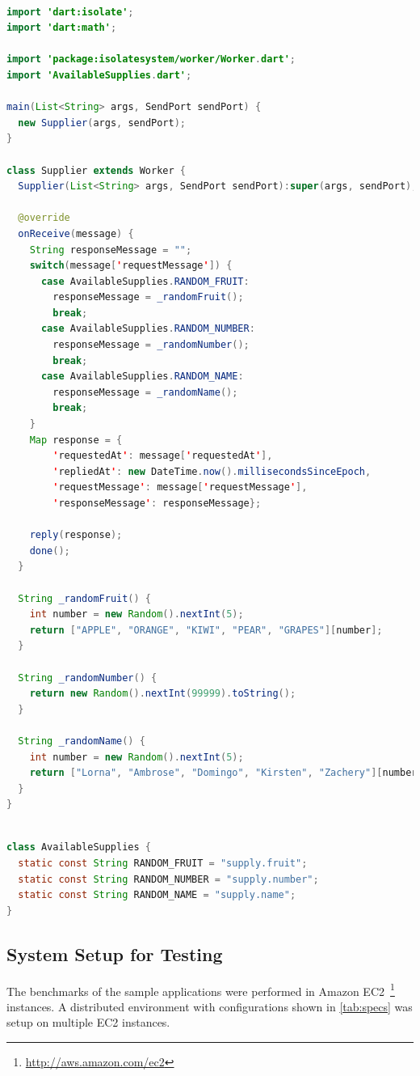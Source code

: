 \begin{lstlisting}[language=java, firstnumber=1, caption=Requester Worker of Requester-Supplier application, label=lst:supplier]

import 'dart:isolate';
import 'dart:math';

import 'package:isolatesystem/worker/Worker.dart';
import 'AvailableSupplies.dart';

main(List<String> args, SendPort sendPort) {
  new Supplier(args, sendPort);
}

class Supplier extends Worker {
  Supplier(List<String> args, SendPort sendPort):super(args, sendPort);

  @override
  onReceive(message) {
    String responseMessage = "";
    switch(message['requestMessage']) {
      case AvailableSupplies.RANDOM_FRUIT:
        responseMessage = _randomFruit();
        break;
      case AvailableSupplies.RANDOM_NUMBER:
        responseMessage = _randomNumber();
        break;
      case AvailableSupplies.RANDOM_NAME:
        responseMessage = _randomName();
        break;
    }
    Map response = {
        'requestedAt': message['requestedAt'],
        'repliedAt': new DateTime.now().millisecondsSinceEpoch,
        'requestMessage': message['requestMessage'],
        'responseMessage': responseMessage};

    reply(response);
    done();
  }

  String _randomFruit() {
    int number = new Random().nextInt(5);
    return ["APPLE", "ORANGE", "KIWI", "PEAR", "GRAPES"][number];
  }

  String _randomNumber() {
    return new Random().nextInt(99999).toString();
  }

  String _randomName() {
    int number = new Random().nextInt(5);
    return ["Lorna", "Ambrose", "Domingo", "Kirsten", "Zachery"][number];
  }
}

\end{lstlisting}

\begin{lstlisting}[language=java, firstnumber=1, caption=Supporting class that contains list of constants for pattern matching, label=lst:supportingClass]

class AvailableSupplies {
  static const String RANDOM_FRUIT = "supply.fruit";
  static const String RANDOM_NUMBER = "supply.number";
  static const String RANDOM_NAME = "supply.name";
}
\end{lstlisting}


\subsection{System Setup for Testing}
    The benchmarks of the sample applications were performed in Amazon EC2~\footnote{\url{http://aws.amazon.com/ec2}} instances. A distributed environment with configurations shown in \autoref{tab:specs} was setup on multiple EC2 instances.

